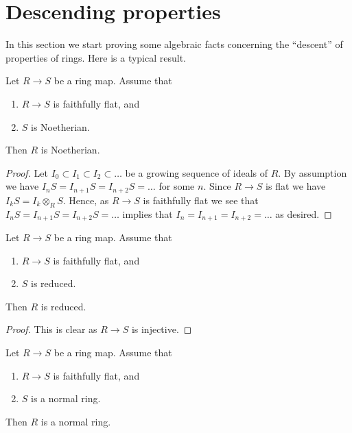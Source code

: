 \section{Descending properties}
\label{section-descending-properties}

\noindent
In this section we start proving some algebraic facts concerning the
``descent'' of properties of rings. Here is a typical result.

\begin{lemma}
\label{lemma-descent-Noetherian}
Let $R \to S$ be a ring map.
Assume that
\begin{enumerate}
\item $R \to S$ is faithfully flat, and
\item $S$ is Noetherian.
\end{enumerate}
Then $R$ is Noetherian.
\end{lemma}

\begin{proof}
Let $I_0 \subset I_1 \subset I_2 \subset \ldots$ be a
growing sequence of ideals of $R$. By assumption we have
$I_nS = I_{n +1}S = I_{n + 2}S = \ldots$ for some $n$.
Since $R \to S$ is flat we have $I_kS = I_k \otimes_R S$.
Hence, as $R \to S$ is faithfully flat we see that
$I_nS = I_{n +1}S = I_{n + 2}S = \ldots$ implies that
$I_n = I_{n +1} = I_{n + 2} = \ldots$ as desired.
\end{proof}

\begin{lemma}
\label{lemma-descent-reduced}
Let $R \to S$ be a ring map.
Assume that
\begin{enumerate}
\item $R \to S$ is faithfully flat, and
\item $S$ is reduced.
\end{enumerate}
Then $R$ is reduced.
\end{lemma}

\begin{proof}
This is clear as $R \to S$ is injective.
\end{proof}

\begin{lemma}
\label{lemma-descent-normal}
Let $R \to S$ be a ring map.
Assume that
\begin{enumerate}
\item $R \to S$ is faithfully flat, and
\item $S$ is a normal ring.
\end{enumerate}
Then $R$ is a normal ring.
\end{lemma}

